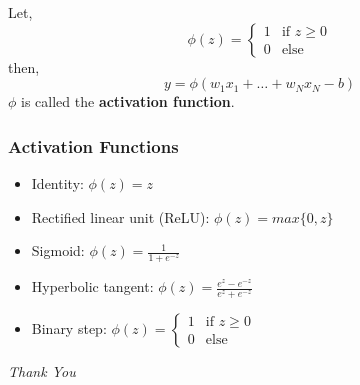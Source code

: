 \documentclass[12pt,aspectratio=169]{beamer}
\begin{document}
\begin{frame}
Let,
\[
\phi(z)=\left \{ \begin{array}{ll}
1 &\mbox{if }z\geq 0\\
0 &\mbox{else}
\end{array}
\right.
\]
then,
\[
y=\phi(w_1x_1+\dots+w_Nx_N-b)
\]
$\phi$ is called the \textbf{activation function}.
\end{frame}

\begin{frame}
\frametitle{Activation Functions}
\begin{itemize}
\item Identity: $\phi(z)=z$
\bigskip
\item Rectified linear unit (ReLU): $\phi (z)=max\{0,z\}$
\bigskip
\item Sigmoid: $\phi(z)=\frac{1}{1+e^{-z}}$
\bigskip
\item Hyperbolic tangent: $\phi(z)=\frac{e^z-e^{-z}}{e^z+e^{-z}}$
\bigskip
\item Binary step: $
\phi(z)=\left \{ \begin{array}{ll}
1 &\mbox{if }z\geq 0\\
0 &\mbox{else}
\end{array}
\right.
$
\end{itemize}
\end{frame}




\begin{frame}{}
  \centering \Huge
  \emph{Thank You}
\end{frame}
\end{document}
